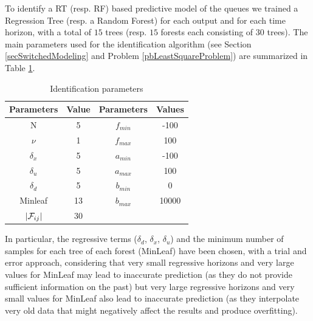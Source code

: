 To identify a RT (resp. RF) based predictive model of the queues we trained a Regression Tree (resp. a Random Forest) for each output and for each time horizon, with a total of $15$ trees (resp. $15$ forests each consisting of $30$ trees). The main parameters used for the identification algorithm (see Section \ref{secSwitchedModeling} and Problem \ref{pbLeastSquareProblem}) are summarized in Table \ref{tab:idPar}.  
\begin{table}[h!]
	\caption{Identification parameters}
	\centering
	\begin{tabular}{c c c c}
		\hline\hline
		Parameters & Value & Parameters & Values\\ 
		\hline
		N               & 5    & $f_{min}$   &-100 \\
		$\nu$        & 1     & $f_{max}$  &100  \\
		$\delta_x$ & 5     & $a_{min}$  &-100  \\
		$\delta_u$ & 5     & $a_{max}$ &100 \\
		$\delta_d$ & 5   & $b_{min}$  &0  \\
		Minleaf      & 13   & $b_{max}$ &10000  \\
		$|\mathcal{F}_{ij}|$      & 30  &                   &\\
		\hline
	\end{tabular}
	\label{tab:idPar}
\end{table}
In particular, the regressive terms ($\delta_d$, $\delta_x$, $\delta_u$) and the minimum number of samples for each tree of each forest (MinLeaf) have been chosen, with a trial and error approach, considering that very small regressive horizons and very large values for MinLeaf may lead to inaccurate prediction (as they do not provide sufficient information on the past) but very large regressive horizons and very small values for MinLeaf also lead to inaccurate prediction (as they interpolate very old data that might negatively affect the results and produce overfitting).

